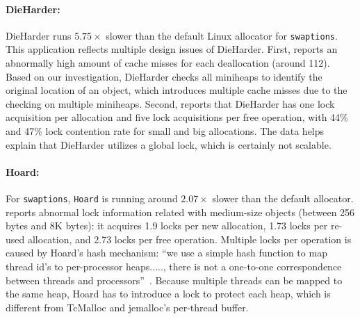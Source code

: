 
\paragraph{DieHarder:} DieHarder runs $5.75\times$ slower than the default Linux allocator for \texttt{swaptions}. This application reflects multiple design issues of DieHarder. First, \MP{} reports an abnormally high amount of cache misses for each deallocation (around 112). Based on our investigation, DieHarder checks all miniheaps to identify the original location of an object, which introduces multiple cache misses due to the checking on multiple miniheaps. Second, \MP{} reports that DieHarder has one lock acquisition per allocation and five lock acquisitions per free operation, with 44\%  and 47\% lock contention rate for small and big allocations. The data helps explain that DieHarder utilizes a global lock, which is certainly not scalable.  



\paragraph{Hoard:} 
For \texttt{swaptions}, \texttt{Hoard} is running around $2.07\times$ slower than the default allocator. \MP{} reports abnormal lock information related with medium-size objects (between 256 bytes and 8K bytes): it acquires 1.9 locks per new allocation, 1.73 locks per re-used allocation, and 2.73 locks per free operation. 
Multiple locks per operation is caused by Hoard's hash mechanism: ``we use a simple hash function to map thread id’s to per-processor heaps....., there is not a one-to-one correspondence between threads and processors''~\cite{Hoard}. Because multiple threads can be mapped to the same heap, Hoard has to introduce a lock to protect each heap, which is different from TcMalloc and jemalloc's per-thread buffer. 

